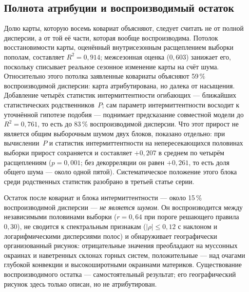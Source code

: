 \documentclass[11pt,a4paper]{article}
\begin{document}
\subsection{Полнота атрибуции и воспроизводимый остаток}
\label{sec:residual}

Долю карты, которую восемь ковариат объясняют, следует считать не от полной дисперсии, а от той её части, которая вообще воспроизводима. Потолок восстановимости карты, оценённый внутрисезонным расщеплением выборки пополам, составляет $R^2=0{,}914$; межсезонная оценка ($0{,}603$) занижает его, поскольку списывает реальное сезонное изменение карты на счёт шума. Относительно этого потолка заявленные ковариаты объясняют 59\,\% воспроизводимой дисперсии: карта атрибутирована, но далека от насыщения. Добавление четырёх статистик интермиттентности огибающих --- ближайших статистических родственников~$P$; сам параметр интермиттентности восходит к уточнённой гипотезе подобия \cite{Kolmogorov1962} --- поднимает предсказание совместной модели до $R^2=0{,}761$, то есть до 83\,\% воспроизводимой дисперсии. Что этот прирост не является общим выборочным шумом двух блоков, показано отдельно: при вычислении~$P$ и статистик интермиттентности на непересекающихся половинах выборки прирост сохраняется и составляет $+0{,}207$ в среднем по четырём расщеплениям ($p=0{,}001$; без декорреляции он равен $+0{,}261$, то есть доля общего шума --- около одной пятой). Систематическое положение этого блока среди родственных статистик разобрано в третьей статье серии.

Остаток после ковариат и блока интермиттентности --- около 15\,\% воспроизводимой дисперсии --- \emph{не является шумом}. Он воспроизводится между независимыми половинами выборки ($r=0{,}64$ при пороге решающего правила $0{,}30$), не сводится к спектральным признакам ($\lvert\rho\rvert\le0{,}12$ с наклоном и логарифмическими дисперсиями полос) и обнаруживает географически организованный рисунок: отрицательные значения преобладают на муссонных окраинах \cite{RodwellHoskins1996} и наветренных склонах горных систем, положительные --- над очагами глубокой конвекции и высокоширотными окраинами материков. Существование воспроизводимого остатка --- самостоятельный результат; его географический рисунок здесь только описан, но не атрибутирован.
\end{document}
